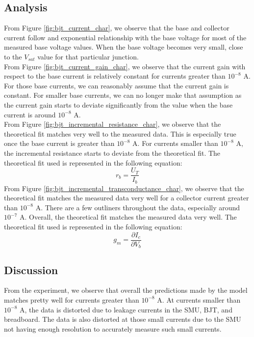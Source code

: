 \documentclass[9pt,a4paper,column,twoside]{tau-class/tau}
\begin{document}
	\subsection{Analysis}
	From Figure \ref{fig:bjt_current_char}, we observe that the base and collector current follow and exponential relationship with the base voltage for most of the measured base voltage values. When the base voltage becomes very small, close to the $V_{sat}$ value for that particular junction.\\
	From Figure \ref{fig:bjt_current_gain_char}, we observe that the current gain with respect to the base current is relatively constant for currents greater than $10^{-8}$ A. For those base currents, we can reasonably assume that the current gain is constant. For smaller base currents, we can no longer make that assumption as the current gain starts to deviate significantly from the value when the base current is around $10^{-8}$ A.\\
	From Figure \ref{fig:bjt_incremental_resistance_char}, we observe that the theoretical fit matches very well to the measured data. This is especially true once the base current is greater than $10^{-8}$ A. For currents smaller than $10^{-8}$ A, the incremental resistance starts to deviate from the theoretical fit. The theoretical fit used is represented in the following equation:
	\[r_b=\frac{U_T}{I_b}\]
	From Figure \ref{fig:bjt_incremental_transconductance_char}, we observe that the theoretical fit matches the measured data very well for a collector current greater than $10^{-8}$ A. There are a few outliners throughout the data, especially around $10^{-7}$ A. Overall, the theoretical fit matches the measured data very well. The theoretical fit used is represented in the following equation:
	\[g_m=\frac{\partial I_c}{\partial V_b}\]
	\subsection{Discussion}
	From the experiment, we observe that overall the predictions made by the model matches pretty well for currents greater than $10^{-8}$ A. At currents smaller than $10^{-8}$ A, the data is distorted due to leakage currents in the SMU, BJT, and breadboard. The data is also distorted at those small currents due to the SMU not having enough resolution to accurately measure such small currents.
\end{document}
